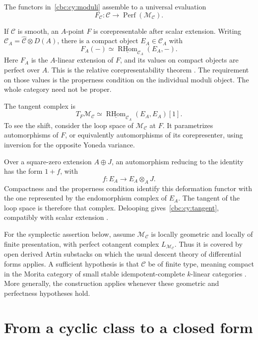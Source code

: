 The functors in~\eqref{cbc:cy:moduli} assemble to a universal evaluation
\[
 F_{\mathcal C}:\mathcal C\longrightarrow
                  \operatorname{Perf}(\mathcal M_{\mathcal C}).
\]

If $\mathcal C$ is smooth, an $A$-point $F$ is corepresentable after scalar extension.
Writing $\mathcal C_A=\widehat{\mathcal C}\otimes D(A)$, there is a compact object $E_A\in\mathcal C_A$ with
\[
 F_A(-)\simeq\underline{\operatorname{RHom}}_{\mathcal C_A}(E_A,-).
\]
Here $F_A$ is the $A$-linear extension of $F$, and its values on compact objects are perfect over $A$.
This is the relative corepresentability theorem
\cite[Corollary~2.6 and Example~3.7]{BravDyckerhoff}.
The requirement on those values is the properness condition on the individual moduli object.
The whole category need not be proper.

The tangent complex is
\begin{equation}\label{cbc:cy:tangent}
 T_F\mathcal M_{\mathcal C}\simeq
 \underline{\operatorname{RHom}}_{\mathcal C_A}(E_A,E_A)[1].
\end{equation}
To see the shift, consider the loop space of $\mathcal M_{\mathcal C}$ at $F$.
It parametrizes automorphisms of $F$, or equivalently automorphisms of its corepresenter, using inversion for the opposite Yoneda variance.

Over a square-zero extension $A\oplus J$, an automorphism reducing to the identity has the form $1+f$, with
\[
 f:E_A\longrightarrow E_A\otimes_A J.
\]
Compactness and the properness condition identify this deformation functor with the one represented by the endomorphism complex of $E_A$.
The tangent of the loop space is therefore that complex.
Delooping gives~\eqref{cbc:cy:tangent}, compatibly with scalar extension
\cite[Proposition~3.3]{BravDyckerhoff}.

For the symplectic assertion below, assume $\mathcal M_{\mathcal C}$ is locally geometric and locally of finite presentation, with perfect cotangent complex $L_{\mathcal M_{\mathcal C}}$.
Thus it is covered by open derived Artin substacks on which the usual descent theory of differential forms applies.
A sufficient hypothesis is that $\mathcal C$ be of finite type, meaning compact in the Morita category of small stable idempotent-complete $k$-linear categories
\cite[Remark~3.9]{BravDyckerhoff}.
More generally, the construction applies whenever these geometric and perfectness hypotheses hold.

\section{From a cyclic class to a closed form}

